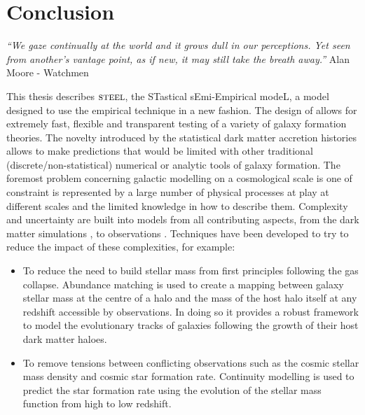 
\chapter{Conclusion} %
\label{Chapter:Conclusion}
\begin{center}
    \textit{``We gaze continually at the world and it grows dull in our perceptions. Yet seen from another's vantage point, as if new, it may still take the breath away.''}
    Alan Moore - Watchmen
\end{center}


This thesis describes $\textsc{steel}$, the STastical sEmi-Empirical modeL, a model designed to use the empirical technique in a new fashion. The design of \steel allows for extremely fast, flexible and transparent testing of a variety of galaxy formation theories. The novelty introduced by the statistical dark matter accretion histories allows \steel to make predictions that would be limited with other traditional (discrete/non-statistical) numerical or analytic tools of galaxy formation. The foremost problem concerning galactic modelling on a cosmological scale is one of constraint is represented by a large number of physical processes at play at different scales and the limited knowledge in how to describe them. Complexity and uncertainty are built into models from all contributing aspects, from the dark matter simulations \cite[e.g.]{vandenBosch2018DisruptionFiction}, to observations \cite[e.g.]{Bernardi2017ComparingLight, Lapi2017StellarEquation, Leja2019AnSurvey}. Techniques have been developed to try to reduce the impact of these complexities, for example:
\begin{itemize}
    \item To reduce the need to build stellar mass from first principles following the gas collapse. Abundance matching is used to create a mapping between galaxy stellar mass at the centre of a halo and the mass of the host halo itself at any redshift accessible by observations. In doing so it provides a robust framework to model the evolutionary tracks of galaxies following the growth of their host dark matter haloes.
    \item To remove tensions between conflicting observations such as the cosmic stellar mass density and cosmic star formation rate. Continuity modelling is used to predict the star formation rate using the evolution of the stellar mass function from high to low redshift. 
\end{itemize}

